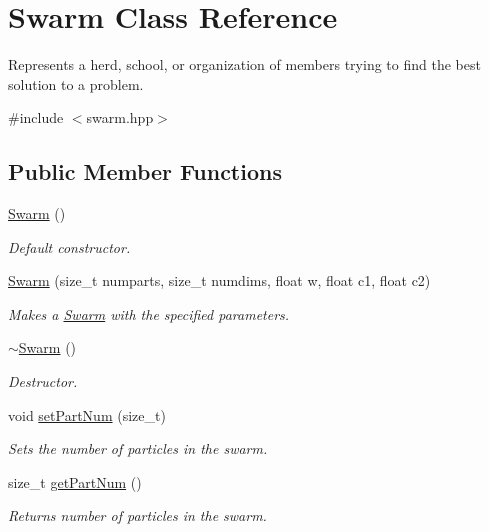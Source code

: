 \hypertarget{classSwarm}{}\section{Swarm Class Reference}
\label{classSwarm}


Represents a herd, school, or organization of members trying to find the best solution to a problem.  




{\ttfamily \#include $<$swarm.\+hpp$>$}

\subsection*{Public Member Functions}
\begin{DoxyCompactItemize}
\item 
\mbox{\hyperlink{classSwarm_a35a9ddd3e07819b46badca515be25e6d}{Swarm}} ()
\begin{DoxyCompactList}\small\item\em Default constructor. \end{DoxyCompactList}\item 
\mbox{\hyperlink{classSwarm_a1b01d9f7d5730111670d94a368e74dd8}{Swarm}} (size\+\_\+t numparts, size\+\_\+t numdims, float w, float c1, float c2)
\begin{DoxyCompactList}\small\item\em Makes a \mbox{\hyperlink{classSwarm}{Swarm}} with the specified parameters. \end{DoxyCompactList}\item 
\mbox{\hyperlink{classSwarm_a5d74bf7e768edf0d8930ba187005a583}{$\sim$\+Swarm}} ()
\begin{DoxyCompactList}\small\item\em Destructor. \end{DoxyCompactList}\item 
void \mbox{\hyperlink{classSwarm_a94c68335146f6eaa39bc7648236ccc61}{set\+Part\+Num}} (size\+\_\+t)
\begin{DoxyCompactList}\small\item\em Sets the number of particles in the swarm. \end{DoxyCompactList}\item 
\mbox{\label{classSwarm_adf953ad641a07016444604070d3f87af}} 
size\+\_\+t \mbox{\hyperlink{classSwarm_adf953ad641a07016444604070d3f87af}{get\+Part\+Num}} ()
\begin{DoxyCompactList}\small\item\em Returns number of particles in the swarm. \end{DoxyCompactList}\item 

\end{DoxyCompactItemize}
